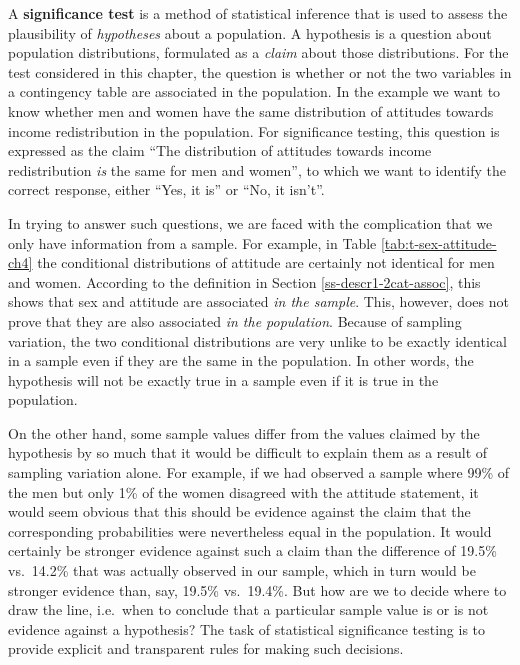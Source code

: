 \documentclass[11pt,a4paper,openany]{book}
\begin{document}
A \textbf{significance test} is a method of statistical inference that
is used to assess the plausibility of \emph{hypotheses} about a
population. A hypothesis is a question about population distributions,
formulated as a \emph{claim} about those distributions. For the test
considered in this chapter, the question is whether or not the two
variables in a contingency table are associated in the population. In
the example we want to know whether men and women have the same
distribution of attitudes towards income redistribution in the
population. For significance testing, this question is expressed as the
claim ``The distribution of attitudes towards income redistribution
\emph{is} the same for men and women'', to which we want to identify the
correct response, either ``Yes, it is'' or ``No, it isn't''.

In trying to answer such questions, we are faced with the complication
that we only have information from a sample. For example, in Table
\ref{tab:t-sex-attitude-ch4} the conditional distributions of attitude
are certainly not identical for men and women. According to the
definition in Section \ref{ss-descr1-2cat-assoc}, this shows that sex
and attitude are associated \emph{in the sample}. This, however, does
not prove that they are also associated \emph{in the population}.
Because of sampling variation, the two conditional distributions are
very unlike to be exactly identical in a sample even if they are the
same in the population. In other words, the hypothesis will not be
exactly true in a sample even if it is true in the population.

On the other hand, some sample values differ from the values claimed by
the hypothesis by so much that it would be difficult to explain them as
a result of sampling variation alone. For example, if we had observed a
sample where 99\% of the men but only 1\% of the women disagreed with
the attitude statement, it would seem obvious that this should be
evidence against the claim that the corresponding probabilities were
nevertheless equal in the population. It would certainly be stronger
evidence against such a claim than the difference of 19.5\% vs.~14.2\%
that was actually observed in our sample, which in turn would be
stronger evidence than, say, 19.5\% vs.~19.4\%. But how are we to decide
where to draw the line, i.e.~when to conclude that a particular sample
value is or is not evidence against a hypothesis? The task of
statistical significance testing is to provide explicit and transparent
rules for making such decisions.
\end{document}
